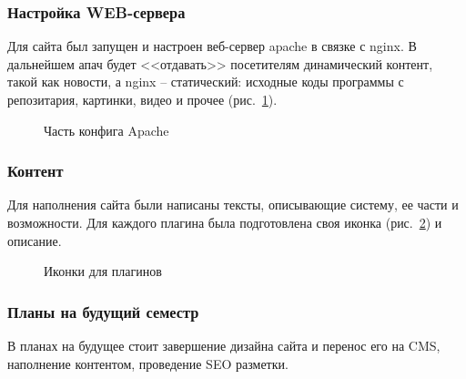 \subsubsection{ Настройка WEB-сервера }

Для сайта был запущен и настроен веб-сервер apache в связке с nginx. В дальнейшем апач будет <<отдавать>> посетителям динамический контент, такой как новости, а nginx – статический: исходные коды программы с репозитария, картинки, видео и прочее (рис.~\ref{lo6:lo6}).

\begin{figure}[h!]
\center{\texttt{[image: lo6]}}
\caption{ Часть конфига Apache }
\label{lo6:lo6}
\end{figure}

\subsubsection{ Контент }

Для наполнения сайта были написаны тексты, описывающие систему, ее части и возможности. Для каждого плагина была подготовлена своя иконка (рис.~\ref{lo7:lo7}) и описание.

\begin{figure}[h!]
\center{\texttt{[image: lo7]}}
\caption{ Иконки для плагинов }
\label{lo7:lo7}
\end{figure}

\subsubsection{ Планы на будущий семестр }

В планах на будущее стоит завершение дизайна сайта и перенос его на CMS, наполнение контентом, проведение SEO разметки.

\clearpage









